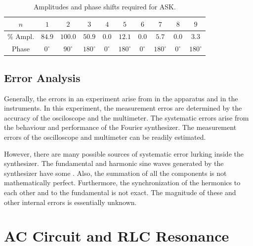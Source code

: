 \documentclass[12pt, a4paper, oneside, openright, titlepage]{book}
\begin{document}
\begin{itemize}[leftmargin = 50pt]
        \begin{table}[H]
            \centering 
            \caption{Amplitudes and phase shifts required for ASK.}
            \begin{tabular}{|c|c|c|c|c|c|c|c|c|c|}
                \hline
                $n$ & $1$ & $2$ & $3$ & $4$ & $5$ & $6$ & $7$ & $8$ & $9$ \\ \hline
                \% Ampl. & $84.9$ & $100.0 $& $50.9$ & $0.0$ & $12.1$ & $0.0$ & $5.7$ & $0.0$ & $3.3$ \\ 
                Phase & $0^{\circ}$ & $90^{\circ}$ & $180^{\circ}$ & $0^{\circ}$ & $180^{\circ}$ & $0^{\circ}$ & $180^{\circ}$ & $0^{\circ}$ & $180^{\circ}$ \\ \hline
            \end{tabular}
            \label{tab:FS8}
        \end{table}
\end{itemize}

\section{Error Analysis}

Generally, the errors in an experiment arise from  in the apparatus and  in the instruments. In this experiment, the measurement erros are determined by the accuracy of the osciloscope and the multimeter. The systematic errors arise from the behaviour and performance of the Fourier synthesizer. The measurement errors of the oscilloscope and multimeter can be readily estimated.

However, there are many possible sources of systematic error lurking inside the synthesizer. The fundamental and harmonic sine waves generated by the synthesizer have some . Also, the summation of all the components is not mathematically perfect. Furthermore, the synchronization of the hermonics to each other and to the fundamental is not exact. The magnitude of these and other internal errors is essentially unknown. 



\chapter{AC Circuit and RLC Resonance}
\end{document}
